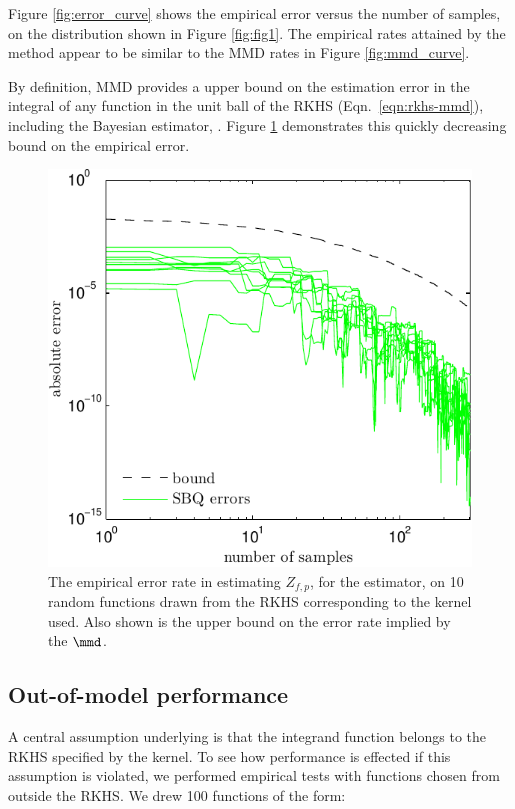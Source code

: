 Figure \ref{fig:error_curve} shows the empirical error versus the number of samples, on the distribution shown in Figure \ref{fig:fig1}. The empirical rates attained by the method appear to be similar to the MMD rates in Figure \ref{fig:mmd_curve}.

By definition, MMD provides a upper bound on the estimation error in the integral of any function in the unit ball of the RKHS (Eqn.\ \eqref{eqn:rkhs-mmd}), including the Bayesian estimator, \sbq{}. Figure \ref{fig:bound_curve} demonstrates this quickly decreasing bound on the \sbq{} empirical error.

\begin{figure}
\includegraphics[width=\columnwidth]{figs/herding/bound_curve_rkhs}
\caption[Illustrating MMD as an upper bound on empirical error rate]{The empirical error rate in estimating $Z_{f,p}$,  for the \sbq{} estimator, on 10 random functions drawn from the RKHS corresponding to the kernel used. Also shown is the upper bound on the error rate implied by the $\mmd$.}
\label{fig:bound_curve}
\end{figure}

\subsection{Out-of-model performance}

A central assumption underlying \sbq{} is that the integrand function belongs to the RKHS specified by the kernel. To see how performance is effected if this assumption is violated, we performed empirical tests with functions chosen from outside the RKHS. We drew 100 functions of the form:

